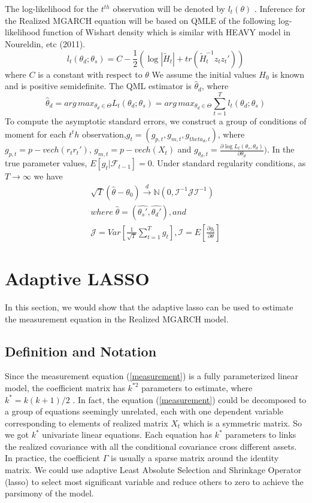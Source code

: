 \documentclass[titlepage,11pt]{article}
\begin{document}
 The log-likelihood for the $t^{th}$  observation will be denoted by $l_{t}(\theta)$ . Inference for the Realized MGARCH equation will be based on QMLE of the following log-likelihood function of Wishart density which is similar with HEAVY model in Noureldin, etc (2011).
\begin{equation}
l_{t}(\theta_d;\theta_s) = C-\frac{1}{2}(\log|\tilde{H}_t|+tr(\tilde{H}_t^{-1} z_t z_t'))
\end{equation}
where $C$ is a constant with respect to $\theta$
We assume the initial values $H_0$ is known and is positive semidefinite. 
The QML estimator is $\hat{\theta}_d$, where 
\[\hat{\theta}_d = arg\,max_{\theta_d \in \Theta} L_{t}(\theta_d;\theta_s)=arg\,max_{\theta_d \in \Theta} \sum_{t=1}^{T} l_{t}(\theta_d;\theta_s)\]
To compute the asymptotic standard errors, we construct a group of conditions of moment for each $t^th$ observation,$g_t=(g_{p,t},g_{m,t},g_{theta_d,t})$, where $g_{p,t} = p-vech(r_t r_t')$, $g_{m,t} = p-vech(X_t)$ and $g_{\theta_d,t} =\frac{\partial \log L_{t}(\theta_s,\theta_d)}{\partial \theta_d}) $. In the true parameter values, $E[g_t|\mathcal{F}_{t-1}]=0$. Under standard regularity conditions, as $T \rightarrow \infty $ we have
\begin{align}
\sqrt{T} (\hat{\theta}-\theta_0) \overset{d}{\rightarrow} \mathbb{N} (0, \mathcal{I}^{-1} \mathcal{J} \mathcal{I}^{-1})\\
where \; \hat{\theta}= (\hat{\theta_s'}, \hat{\theta_d'}), and \nonumber \\
\mathcal{J}=Var \left[\frac{1}{\sqrt{T}} \sum_{t=1}^{T}g_t\right], \mathcal{I}=E \left[\frac{\partial g_t}{\partial \theta}\right]
\end{align} 


\section{Adaptive LASSO}

In this section, we would show that the adaptive lasso can be used to estimate the measurement equation in the Realized MGARCH model.
\subsection{Definition and Notation}

Since the measurement equation (\ref{measurement})    is a fully parameterized linear model, the coefficient matrix  has $k^{*2}$ parameters to estimate, where $k^*=k(k+1)/2$ . In fact, the equation (\ref{measurement}) could be decomposed to a group of equations seemingly unrelated, each with one dependent variable corresponding to elements of realized matrix $X_t$ which is a symmetric matrix. So we got $k^*$ univariate linear equations. Each equation has $k^*$ parameters to links the realized covariance with all the conditional covariance cross different assets.
In practice, the coefficient $\Gamma$ is usually a sparse matrix around the identity matrix. We could use adaptive Least Absolute Selection and Shrinkage Operator (lasso) to select most significant variable and reduce others to zero to achieve the parsimony of the model.
\end{document}
